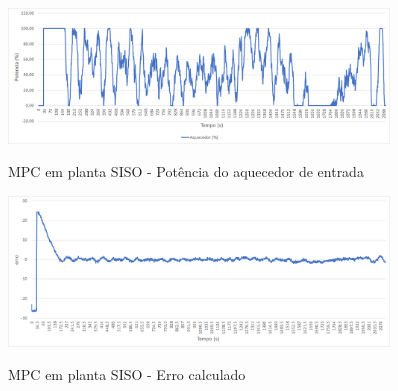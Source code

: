 \begin{figure}
    \caption{MPC em planta SISO - Potência do aquecedor de entrada}
	\begin{center}
		\includegraphics[width=0.9\textwidth]{./5_images/Exp_401_PlotResults_02_SS_x1_6.png} 
		\label{fig:siso_mpc_and_plant_plot02}
	\end{center}
    \centering
\end{figure}

\begin{figure}
    \caption{MPC em planta SISO - Erro calculado}
	\begin{center}
		\includegraphics[width=0.9\textwidth]{./5_images/Exp_401_PlotResults_03_SS_x1_6.png} 
		\label{fig:siso_mpc_and_plant_plot03}
	\end{center}
    \centering
\end{figure}